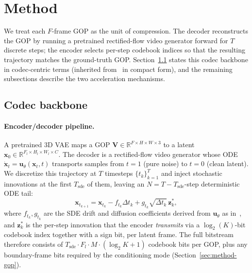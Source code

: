 \section{Method}
\label{sec:method}

We treat each $F$-frame GOP as the unit of compression. The decoder
reconstructs the GOP by running a pretrained rectified-flow video
generator forward for $T$ discrete steps; the encoder selects per-step
codebook indices so that the resulting trajectory matches the ground-truth
GOP. Section~\ref{sec:method-pipeline} states this codec backbone in
codec-centric terms (inherited from~\cite{zeng2026gvcc,vaisman2025turboddcm}
in compact form), and the remaining subsections describe the two
acceleration mechanisms.

\subsection{Codec backbone}
\label{sec:method-pipeline}

\paragraph{Encoder/decoder pipeline.}
A pretrained 3D VAE maps a GOP $\mathbf{V}\!\in\!\mathbb{R}^{F\times H\times W\times 3}$
to a latent $\mathbf{x}_0\!\in\!\mathbb{R}^{F_l\times H_l\times W_l\times C}$.
The decoder is a rectified-flow video generator whose ODE
$\dot{\mathbf{x}}_t \!=\! \mathbf{u}_\theta(\mathbf{x}_t, t)$ transports
samples from $t\!=\!1$ (pure noise) to $t\!=\!0$ (clean latent). We
discretize this trajectory at $T$ timesteps $\{t_k\}_{k=1}^T$ and inject
stochastic innovations at the first $T_\text{sde}$ of them, leaving an
$N\!=\!T\!-\!T_\text{sde}$-step deterministic ODE tail:
\begin{equation}
\mathbf{x}_{t_{k+1}} = \mathbf{x}_{t_k} \!-\! f_{t_k}\!\Delta t_k + g_{t_k}\sqrt{\Delta t_k}\,\mathbf{z}^*_{k},
\label{eq:sde-step}
\end{equation}
where $f_{t_k}, g_{t_k}$ are the SDE drift and diffusion coefficients
derived from $\mathbf{u}_\theta$ as in~\cite{zeng2026gvcc}, and
$\mathbf{z}^*_{k}$ is the per-step innovation that the encoder
\emph{transmits} via a $\log_2(K)$-bit codebook index together with a sign
bit, per latent frame. The full bitstream therefore consists of
$T_\text{sde}\!\cdot\! F_l \!\cdot\! M\!\cdot\!(\log_2 K + 1)$ codebook
bits per GOP, plus any boundary-frame bits required by the conditioning
mode (Section~\ref{sec:method-gop}).

